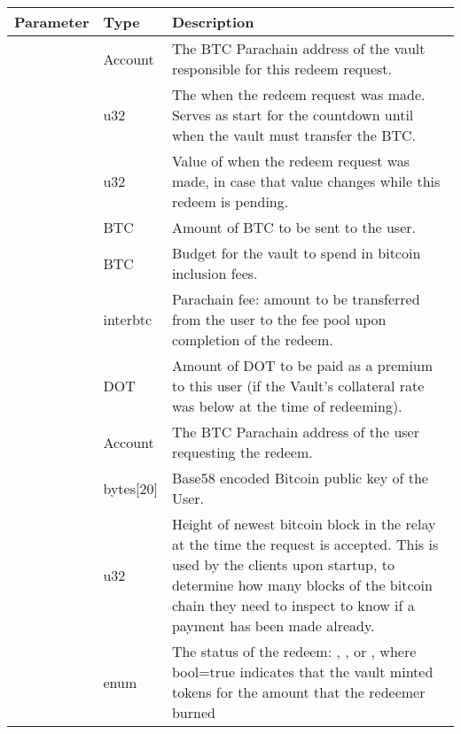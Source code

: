 \documentclass[a4paper,10pt,english]{sphinxmanual}
\begin{document}
\begin{savenotes}\sphinxattablestart
\centering
\begin{tabulary}{\linewidth}[t]{|l|l|L|}
\hline
\sphinxstyletheadfamily 
Parameter
&\sphinxstyletheadfamily 
Type
&\sphinxstyletheadfamily 
Description
\\
\hline
{}
&
Account
&
The BTC Parachain address of the vault responsible for this redeem request.
\\
\hline
{}
&
u32
&
The {\hyperref[\detokenize{spec/security:activeblockcount}]{}} when the redeem request was made. Serves as start for the countdown until when the vault must transfer the BTC.
\\
\hline
{}
&
u32
&
Value of {\hyperref[\detokenize{spec/redeem:redeemperiod}]{}} when the redeem request was made, in case that value changes while this redeem is pending.
\\
\hline
{}
&
BTC
&
Amount of BTC to be sent to the user.
\\
\hline
{}
&
BTC
&
Budget for the vault to spend in bitcoin inclusion fees.
\\
\hline
{}
&
interbtc
&
Parachain fee: amount to be transferred from the user to the fee pool upon completion of the redeem.
\\
\hline
{}
&
DOT
&
Amount of DOT to be paid as a premium to this user (if the Vault’s collateral rate was below  at the time of redeeming).
\\
\hline
{}
&
Account
&
The BTC Parachain address of the user requesting the redeem.
\\
\hline
{}
&
bytes{[}20{]}
&
Base58 encoded Bitcoin public key of the User.
\\
\hline
{}
&
u32
&
Height of newest bitcoin block in the relay at the time the request is accepted. This is used by the clients upon startup, to determine how many blocks of the bitcoin chain they need to inspect to know if a payment has been made already.
\\
\hline
{}
&
enum
&
The status of the redeem: , ,  or , where bool=true indicates that the vault minted tokens for the amount that the redeemer burned
\\
\hline
\end{tabulary}
\par
\sphinxattableend\end{savenotes}
\end{document}
